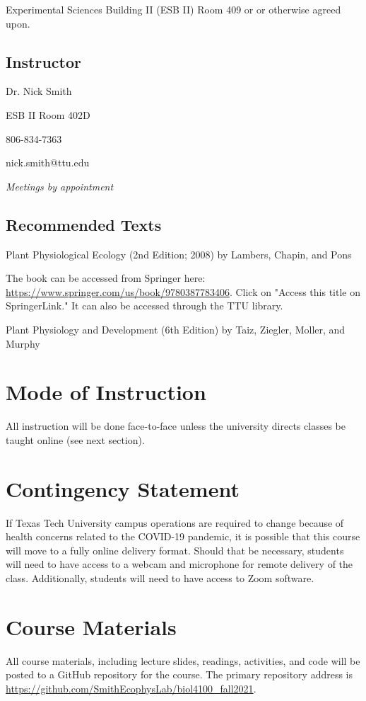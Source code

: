 \documentclass[12pt, notitlepage]{article}   	%
\begin{document}
{Experimental Sciences Building II (ESB II) Room 409 or 
or otherwise agreed upon.

\subsection{Instructor}
Dr. Nick Smith \par
ESB II Room 402D \par
806-834-7363 \par
nick.smith@ttu.edu \par
\textit{Meetings by appointment}

\subsection{Recommended Texts}
Plant Physiological Ecology (2nd Edition; 2008) by Lambers, Chapin, and Pons \par
The book can be accessed from Springer here: 
\url{https://www.springer.com/us/book/9780387783406}. Click on "Access this title on 
SpringerLink." It can also be accessed through the TTU library. \par
Plant Physiology and Development (6th Edition) by Taiz, Ziegler, Moller, and Murphy

\section{Mode of Instruction}
All instruction will be done face-to-face unless the university directs classes be 
taught online (see next section).

\section{Contingency Statement}
If Texas Tech University campus operations are required to change because of health 
concerns related to the COVID-19 pandemic, it is possible that this course will move to 
a fully online delivery format. Should that be necessary, students will need to have 
access to a webcam and microphone for remote delivery of the class. Additionally, students 
will need to have access to Zoom software.

\section{Course Materials}
All course materials, including lecture slides, readings, activities, and code 
will be posted to a GitHub repository for the course.
The primary repository address is
\url{https://github.com/SmithEcophysLab/biol4100_fall2021}.

}
\end{document}
